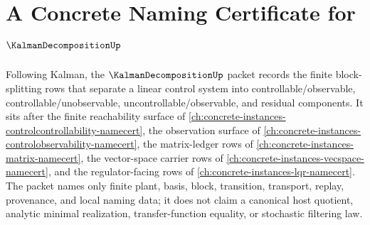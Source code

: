 \chapter{A Concrete Naming Certificate for $\KalmanDecompositionUp$}
\label{ch:concrete-instances-kalman-decomposition-namecert}

Following Kalman, the $\KalmanDecompositionUp$ packet records the finite block-splitting rows that separate a linear control system into controllable/observable, controllable/unobservable, uncontrollable/observable, and residual components. It sits after the finite reachability surface of \autoref{ch:concrete-instances-controlcontrollability-namecert}, the observation surface of \autoref{ch:concrete-instances-controlobservability-namecert}, the matrix-ledger rows of \autoref{ch:concrete-instances-matrix-namecert}, the vector-space carrier rows of \autoref{ch:concrete-instances-vecspace-namecert}, and the regulator-facing rows of \autoref{ch:concrete-instances-lqr-namecert}. The packet names only finite plant, basis, block, transition, transport, replay, provenance, and local naming data; it does not claim a canonical host quotient, analytic minimal realization, transfer-function equality, or stochastic filtering law.

